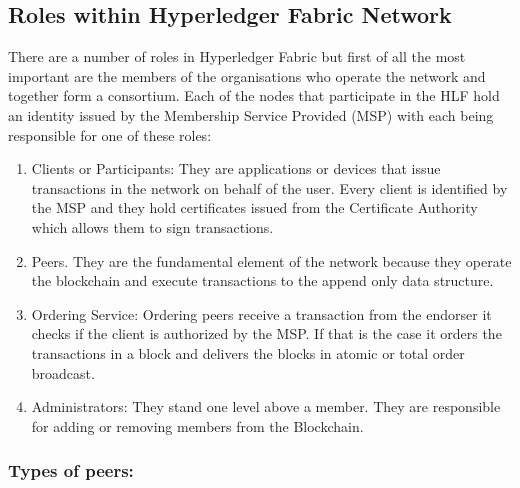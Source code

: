 \subsection{Roles within Hyperledger Fabric Network}
There are a number of roles in Hyperledger Fabric but first of all the most important are the members of the organisations who operate the network and together form a consortium.
Each of the nodes that participate in the HLF hold an identity issued by the Membership Service Provided (MSP) with each being responsible for one of these roles:
\begin{enumerate}
  \item Clients or Participants: They are applications or devices that issue transactions in the network on behalf of the user. Every client is identified by the MSP and they hold certificates issued from the Certificate Authority which allows them to sign transactions.
  \item Peers. They are the fundamental element of the network because they operate the blockchain and execute transactions to the append only data structure. 
  
  \item Ordering Service: Ordering peers receive a transaction from the endorser it checks if the client is authorized by the MSP. If that is the case it orders the transactions in a block and delivers the blocks in atomic or total order broadcast. 
  
  \item Administrators: They stand one level above a member. They are responsible for adding or removing members from the Blockchain. 
  
\end{enumerate}

\subsubsection{Types of peers: }


